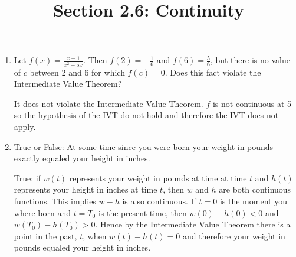 \documentclass[nooutcomes]{ximera}
\title{Section 2.6: Continuity}
\begin{document}
\begin{abstract}		\end{abstract}
\maketitle

\begin{problem}
	\begin{enumerate}
   	\item  Let $f(x) = \frac{x-1}{x^2 - 5x}$.  Then $f(2)=-\frac{1}{6}$ and $f(6)=\frac{5}{6}$, but there is no value of $c$ between $2$ and $6$ for which $f(c)=0$.  Does this fact violate the Intermediate Value Theorem?

      \begin{freeResponse}
        It does not violate the Intermediate Value Theorem.  $f$ is not continuous at 5 so the hypothesis of the IVT do not hold and therefore the IVT does not apply.
      \end{freeResponse}

	\item	True or False: At some time since you were born your weight in pounds exactly equaled your height in inches.
      \begin{freeResponse}
        True: if $w(t)$ represents your weight in pounds at time at time $t$ and $h(t)$ represents your height in inches at time $t$, then $w$ and $h$ are both continuous functions.  This implies $w - h$ is also continuous.
        If $t = 0$ is the moment you where born and $t = T_0$ is the present time, then $w(0) - h(0) < 0$ and $w(T_0) - h(T_0) > 0$.
        Hence by the Intermediate Value Theorem there is a point in the past, $t$, when $w(t)-h(t)=0$ and therefore your weight in pounds equaled your height in inches.
      \end{freeResponse}
	
	\end{enumerate}

\end{problem}
\end{document}
